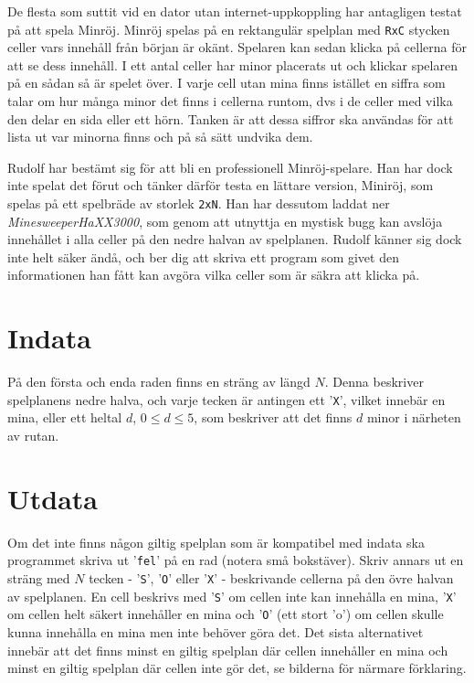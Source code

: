 De flesta som suttit vid en dator utan internet-uppkoppling har antagligen testat på att spela Minröj. Minröj spelas på en rektangulär spelplan med \texttt{RxC} stycken celler vars innehåll från början är okänt. Spelaren kan sedan klicka på cellerna för att se dess innehåll. I ett antal celler har minor placerats ut och klickar spelaren på en sådan så är spelet över. I varje cell utan mina finns istället en siffra som talar om hur många minor det finns i cellerna runtom, dvs i de celler med vilka den delar en sida eller ett hörn. Tanken är att dessa siffror ska användas för att lista ut var minorna finns och på så sätt undvika dem.

Rudolf har bestämt sig för att bli en professionell Minröj-spelare. Han har dock inte spelat det förut och tänker därför testa en lättare version, Miniröj, som spelas på ett spelbräde av storlek \texttt{2xN}. Han har dessutom laddat ner \emph{MinesweeperHaXX3000}, som genom att utnyttja en mystisk bugg kan avslöja innehållet i alla celler på den nedre halvan av spelplanen. Rudolf känner sig dock inte helt säker ändå, och ber dig att skriva ett program som givet den informationen han fått kan avgöra vilka celler som är säkra att klicka på.

\section*{Indata}
På den första och enda raden finns en sträng av längd $N$. Denna beskriver spelplanens nedre halva, och varje tecken är antingen ett '\texttt{X}', vilket innebär en mina, eller ett heltal $d$, $0 \leq d \leq 5$, som beskriver att det finns $d$ minor i närheten av rutan.

\section*{Utdata}
Om det inte finns någon giltig spelplan som är kompatibel med indata ska programmet skriva ut '\texttt{fel}' på en rad (notera små bokstäver). Skriv annars ut en sträng med $N$ tecken - '\texttt{S}', '\texttt{O}' eller '\texttt{X}' - beskrivande cellerna på den övre halvan av spelplanen. En cell beskrivs med '\texttt{S}' om cellen inte kan innehålla en mina, '\texttt{X}' om cellen helt säkert innehåller en mina och '\texttt{O}' (ett stort 'o') om cellen skulle kunna innehålla en mina men inte behöver göra det. Det sista alternativet innebär att det finns minst en giltig spelplan där cellen innehåller en mina och minst en giltig spelplan där cellen inte gör det, se bilderna för närmare förklaring.

